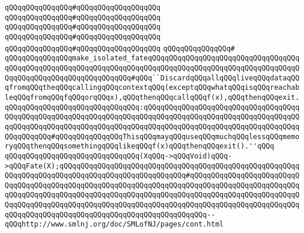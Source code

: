 \verb|qQQqqQQqqQQqqQQq#qQQqqQQqqQQqqQQqqQQq|\newline
\verb|qQQqqQQqqQQqqQQq#qQQqqQQqqQQqqQQqqQQq|\newline
\verb|qQQqqQQqqQQqqQQq#qQQqqQQqqQQqqQQqqQQq|\newline
\verb|qQQqqQQqqQQqqQQq#qQQqqQQqqQQqqQQqqQQq|\newline
\verb|qQQqqQQqqQQqqQQq#qQQqqQQqqQQqqQQqqQQq|\newline
\verb|qQQqqQQqqQQqqQQq#|\newline
\verb|qQQqqQQqqQQqqQQqmake_isolated_fateqQQqqQQqqQQqqQQqqQQqqQQqqQQqqQQqqQQqqQQqqQQqqQQqqQQqqQQqqQQqqQQqqQQqqQQqqQQqqQQqqQQqqQQqqQQqqQQqqQQqqQQqqQQqqQQqqQQqqQQqqQQqqQQqqQQqqQQq#qQQq``DiscardqQQqallqQQqliveqQQqdataqQQqfromqQQqtheqQQqcallingqQQqcontextqQQq(exceptqQQqwhatqQQqisqQQqreachableqQQqfromqQQqfqQQqorqQQqx),qQQqthenqQQqcallqQQqf(x),qQQqthenqQQqexit.|\newline
\verb|qQQqqQQqqQQqqQQqqQQqqQQqqQQqqQQq:qQQqqQQqqQQqqQQqqQQqqQQqqQQqqQQqqQQqqQQqqQQqqQQqqQQqqQQqqQQqqQQqqQQqqQQqqQQqqQQqqQQqqQQqqQQqqQQqqQQqqQQqqQQqqQQqqQQqqQQqqQQqqQQqqQQqqQQqqQQqqQQqqQQqqQQqqQQqqQQqqQQqqQQqqQQqqQQqqQQqqQQqqQQq#qQQqqQQqqQQqqQQqThisqQQqmayqQQquseqQQqmuchqQQqlessqQQqmemoryqQQqthenqQQqsomethingqQQqlikeqQQqf(x)qQQqthenqQQqexit().''qQQq|\newline
\verb|qQQqqQQqqQQqqQQqqQQqqQQqqQQqqQQq(XqQQq->qQQqVoid)qQQq->qQQqFate(X);qQQqqQQqqQQqqQQqqQQqqQQqqQQqqQQqqQQqqQQqqQQqqQQqqQQqqQQqqQQqqQQqqQQqqQQqqQQqqQQqqQQqqQQqqQQqqQQqqQQq#qQQqqQQqqQQqqQQqqQQqqQQqqQQqqQQqqQQqqQQqqQQqqQQqqQQqqQQqqQQqqQQqqQQqqQQqqQQqqQQqqQQqqQQqqQQqqQQqqQQqqQQqqQQqqQQqqQQqqQQqqQQqqQQqqQQqqQQqqQQqqQQqqQQqqQQqqQQqqQQqqQQqqQQqqQQqqQQqqQQqqQQqqQQqqQQqqQQqqQQqqQQqqQQqqQQqqQQqqQQqqQQqqQQqqQQqqQQqqQQqqQQqqQQqqQQqqQQqqQQqqQQqqQQqqQQqqQQqqQQqqQQq--qQQqhttp://www.smlnj.org/doc/SMLofNJ/pages/cont.html|\newline
